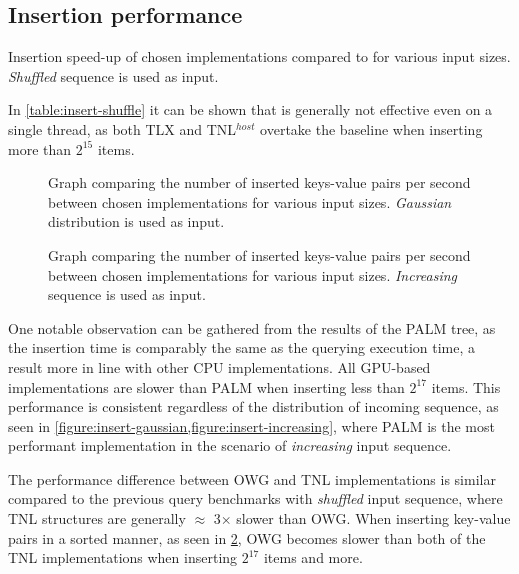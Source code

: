 \subsection{Insertion performance}

\begin{table}
  \centering
  
  \caption[Insertion speed-up compared to , shuffled sequence.]{Insertion speed-up of chosen implementations compared to  for various input sizes. \textit{Shuffled} sequence is used as input.}
  \label{table:insert-shuffle}
\end{table}

In \cref{table:insert-shuffle} it can be shown that  is generally not effective even on a single thread, as both TLX and TNL$^{host}$ overtake the baseline when inserting more than $2^{15}$ items.

\begin{figure}
  
  \caption[Insertion comparison with gaussian distribution as input.]{Graph comparing the number of inserted keys-value pairs per second between chosen implementations for various input sizes. \textit{Gaussian} distribution is used as input.}
  \label{figure:insert-gaussian}
\end{figure}

\begin{figure}
  
  \caption[Insertion comparison with increasing sequence as input.]{Graph comparing the number of inserted keys-value pairs per second between chosen implementations for various input sizes. \textit{Increasing} sequence is used as input.}
  \label{figure:insert-increasing}
\end{figure}

One notable observation can be gathered from the results of the PALM tree, as the insertion time is comparably the same as the querying execution time, a result more in line with other CPU implementations. All GPU-based implementations are slower than PALM when inserting less than $2^{17}$ items. This performance is consistent regardless of the distribution of incoming sequence, as seen in \cref{figure:insert-gaussian,figure:insert-increasing}, where PALM is the most performant implementation in the scenario of \textit{increasing} input sequence.

The performance difference between OWG and TNL implementations is similar compared to the previous query benchmarks with \textit{shuffled} input sequence, where TNL structures are generally $\approx$ 3$\times$ slower than OWG. When inserting key-value pairs in a sorted manner, as seen in \cref{figure:insert-increasing}, OWG becomes slower than both of the TNL implementations when inserting $2^{{17}}$ items and more.
